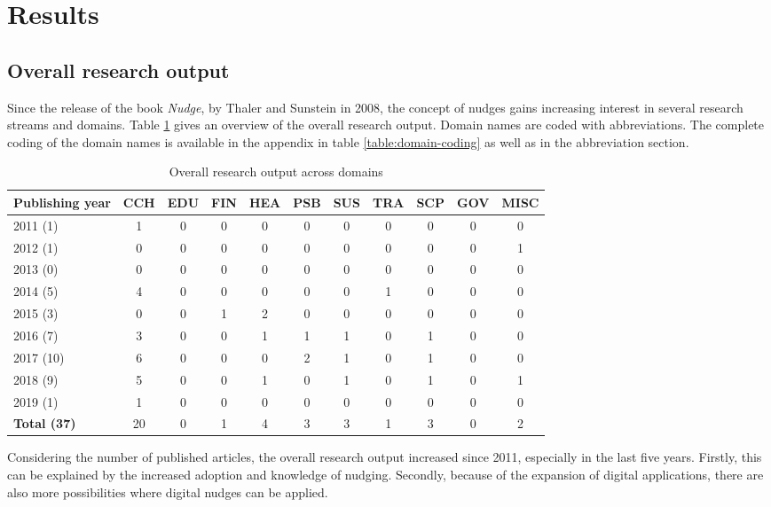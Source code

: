 \section{Results}

\subsection{Overall research output}
Since the release of the book \textit{Nudge}, by Thaler and Sunstein in 2008, the concept of nudges gains increasing interest in several research streams and domains. Table \ref{table:research-output} gives an overview of the overall research output. Domain names are coded with abbreviations. The complete coding of the domain names is available in the appendix in table \ref{table:domain-coding} as well as in the abbreviation section.

\begin{table}[htbp]
\centering
\small
\begin{tabular}{|l|cccccccccc|}
\hline
\textbf{Publishing year} & \textbf{CCH} & \textbf{EDU} & \textbf{FIN} & \textbf{HEA} & \textbf{PSB} & \textbf{SUS} & \textbf{TRA} & \textbf{SCP} & \textbf{GOV} & \textbf{MISC} \\ \hline
2011 (1) & 1 & 0 & 0 & 0 & 0 & 0 & 0 & 0 & 0 &  0 \\
2012 (1) & 0 & 0 & 0 & 0 & 0 & 0 & 0 & 0 & 0 & 1 \\
2013 (0) & 0 & 0 & 0 & 0 & 0 & 0 & 0 & 0 & 0 & 0 \\
2014 (5) & 4 & 0 & 0 & 0 & 0 & 0 & 1 & 0 & 0 & 0 \\
2015 (3) & 0 & 0 & 1 & 2 & 0 & 0 & 0 & 0 & 0 & 0 \\
2016 (7) & 3 & 0 & 0 & 1 & 1 & 1 & 0 & 1 & 0 & 0 \\
2017 (10) & 6 & 0 & 0 & 0 & 2 & 1 & 0 & 1 & 0 & 0 \\
2018 (9) & 5 & 0 & 0 & 1 & 0 & 1 & 0 & 1 & 0 & 1 \\
2019 (1) & 1 & 0 & 0 & 0 & 0 & 0 & 0 & 0 & 0 & 0 \\ \hline
\textbf{Total (37)} & 20 & 0 & 1 & 4 & 3 & 3 & 1 & 3 & 0 & 2 \\ \hline
\end{tabular}
\caption{Overall research output across domains}
\label{table:research-output}
\end{table}

Considering the number of published articles, the overall research output increased since 2011, especially in the last five years. Firstly, this can be explained by the increased adoption and knowledge of nudging. Secondly, because of the expansion of digital applications, there are also more possibilities where digital nudges can be applied.
\\

